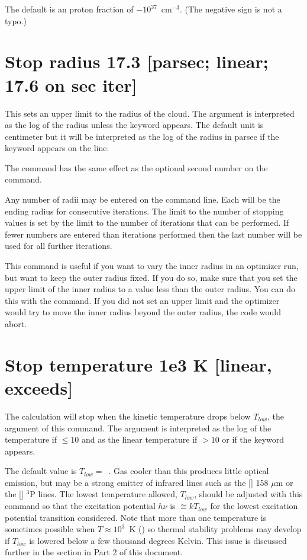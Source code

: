 The default is an proton fraction of $-10^{37}$~cm$^{-3}$.
(The negative sign is not a typo.)

\section{Stop radius 17.3 [parsec; linear; 17.6 on sec iter] }

This sets an upper limit to the radius of the cloud.
The argument
is interpreted as the log of the radius unless the keyword
 appears.
The default unit is centimeter but it will be interpreted
as the log
of the radius in parsec if the keyword 
appears on the line.

The  command has the same effect
as the optional second
number on the  command.

Any number of radii may be entered on the command line.
Each will
be the ending radius for consecutive iterations.
The limit to the number
of stopping values is set by the limit to the number of iterations that
can be performed.
If fewer numbers are entered than iterations performed
then the last number will be used for all further iterations.

This command is useful if you want to vary the inner radius in an optimizer
run, but want to keep the outer radius fixed. If you do so, make sure that you
set the upper limit of the inner radius to a value less than the outer radius.
You can do this with the  command. If you did not
set an upper limit and the optimizer would try to move the inner radius beyond
the outer radius, the code would abort.

\section{Stop temperature 1e3 K [linear, exceeds]}
\label{sec:CommandStopTemperature}

The calculation will stop when the kinetic temperature drops below
$T_{low}$, the argument of this command.
The argument is interpreted as the log of
the temperature if $\le 10$ and as the linear temperature
if $> 10$ or if the  keyword appears.

The default value is $T_{low} =$~\TEMPSTOPDEFAULT.
Gas cooler than this produces little
optical emission, but may be a strong emitter of infrared lines such as
the [\cii] 158 $\mu$m or the [\oi] $^3$P lines.
The lowest temperature allowed,
$T_{low}$, should be adjusted with this command
so that the excitation potential
$h\nu$ is $\cong kT_{low}$ for the lowest excitation potential
transition considered.
Note that more than one temperature is sometimes possible
when $T \approx 10^3$~K
(\citealp{Williams1967}) so thermal stability problems may develop
if $T_{low}$ is lowered
below a few thousand degrees Kelvin.
This issue is discussed further in
the section  in Part 2 of this document.


